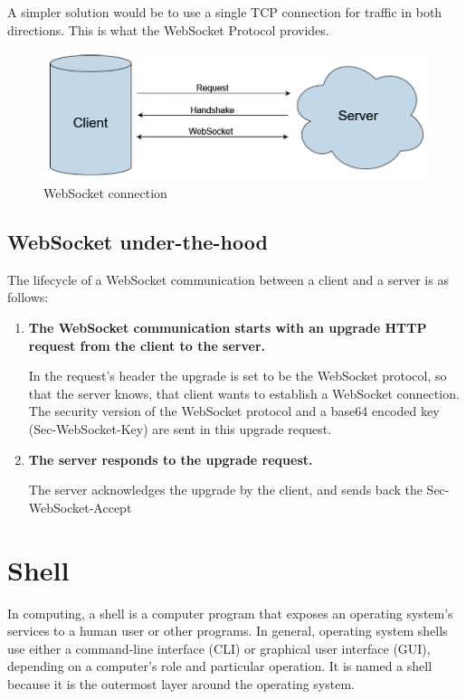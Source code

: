 	A simpler solution would be to use a single TCP connection for
	traffic in both directions.  This is what the WebSocket Protocol
	provides.

	\begin{figure}[h!]
		\includegraphics{include/imgs/websocket.PNG}
		\caption{WebSocket connection}
	\end{figure}

	\subsection{WebSocket under-the-hood}
		The lifecycle of a WebSocket communication between a client and a server is as follows:
		\begin{enumerate}
			\item \textbf{The WebSocket communication starts with an upgrade HTTP request from the client to the server.}
			
			In the request's header the upgrade is set to be the WebSocket protocol, so that the server knows, that client wants to establish a WebSocket connection.
			The security version of the WebSocket protocol and a base64 encoded key (Sec-WebSocket-Key) are sent in this upgrade request. 

			\item  \textbf{The server responds to the upgrade request.}

			The server acknowledges the upgrade by the client, and sends back the Sec-WebSocket-Accept
		\end{enumerate}


\section{Shell}
	In computing, a shell \cite{shell} is a computer program that exposes an operating system's services to a human user or other programs. 
	In general, operating system shells use either a command-line interface (CLI) or graphical user interface (GUI), 
	depending on a computer's role and particular operation. It is named a shell because it is the outermost layer around the operating system.

